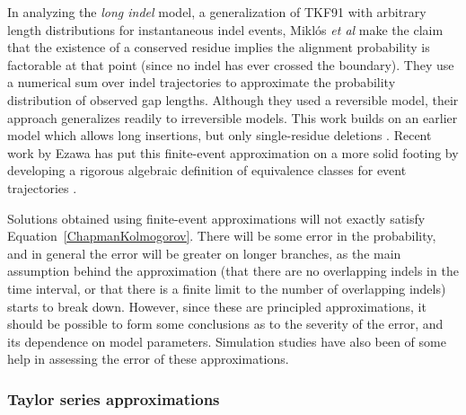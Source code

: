 \documentclass{bmcart}
\newcommand{\eqref}[1]{Equation~\ref{#1}}
\begin{document}
In analyzing the {\em long indel} model,
a generalization of TKF91 with arbitrary length distributions for instantaneous indel events,
Mikl\'{o}s {\em et al} \cite{MiklosLunterHolmes2004}
make the claim that the existence of a conserved residue implies the alignment probability is factorable at that point
 (since no indel has ever crossed the boundary).
They use a numerical sum over indel trajectories to approximate the probability distribution of observed gap lengths.
Although they used a reversible model, their approach generalizes readily to irreversible models.
This work builds on an earlier model which allows long insertions, but only single-residue deletions \cite{MiklosEtal2001}.
Recent work by Ezawa has put this finite-event approximation on a more solid footing
by developing a rigorous algebraic definition of equivalence classes for event trajectories \cite{Ezawa2016a,Ezawa2016b,Ezawa2016bErratum}.

Solutions obtained using finite-event approximations will not exactly satisfy \eqref{ChapmanKolmogorov}.
There will be some error in the probability, and in general the error will be greater
on longer branches, as the main assumption behind the approximation
(that there are no overlapping indels in the time interval, or that there is a finite
limit to the number of overlapping indels)
starts to break down.
However, since these are principled approximations, it should be possible to form some conclusions
as to the severity of the error, and its dependence on model parameters.
Simulation studies have also been of some help in assessing the error of these approximations.

\subsubsection*{Taylor series approximations}
\end{document}
